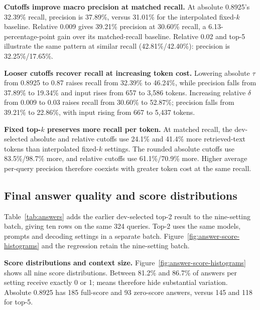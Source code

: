 \documentclass{article}
\begin{document}
\textbf{Cutoffs improve macro precision at matched recall.} At absolute 0.8925's 32.39\% recall, precision is 37.89\%, versus 31.01\% for the interpolated fixed-$k$ baseline. Relative 0.009 gives 39.21\% precision at 30.60\% recall, a 6.13-percentage-point gain over its matched-recall baseline. Relative 0.02 and top-5 illustrate the same pattern at similar recall (42.81\%/42.40\%): precision is 32.25\%/17.65\%.

\textbf{Looser cutoffs recover recall at increasing token cost.} Lowering absolute $\tau$ from 0.8925 to 0.87 raises recall from 32.39\% to 46.24\%, while precision falls from 37.89\% to 19.34\% and input rises from 657 to 3,586 tokens. Increasing relative $\delta$ from 0.009 to 0.03 raises recall from 30.60\% to 52.87\%; precision falls from 39.21\% to 22.86\%, with input rising from 667 to 5,437 tokens.

\textbf{Fixed top-$k$ preserves more recall per token.} At matched recall, the dev-selected absolute and relative cutoffs use 24.1\% and 41.4\% more retrieved-text tokens than interpolated fixed-$k$ settings. The rounded absolute cutoffs use 83.5\%/98.7\% more, and relative cutoffs use 61.1\%/70.9\% more. Higher average per-query precision therefore coexists with greater token cost at the same recall.

\clearpage
\subsection{Final answer quality and score distributions}
Table~\ref{tab:answers} adds the earlier dev-selected top-2 result to the nine-setting batch, giving ten rows on the same 324 queries. Top-2 uses the same models, prompts and decoding settings in a separate batch. Figure~\ref{fig:answer-score-histograms} and the regression retain the nine-setting batch.

\textbf{Score distributions and context size.} Figure~\ref{fig:answer-score-histograms} shows all nine score distributions. Between 81.2\% and 86.7\% of answers per setting receive exactly 0 or 1; means therefore hide substantial variation. Absolute 0.8925 has 185 full-score and 93 zero-score answers, versus 145 and 118 for top-5.
\end{document}
